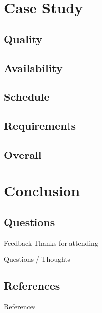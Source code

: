 \section{Case Study}
    \subsection{Quality}
    \subsection{Availability}
    \subsection{Schedule}
    \subsection{Requirements}
    \subsection{Overall}

\section{Conclusion}

    \subsection{Questions}
        \begin{frame}{Feedback}
            \center 
            Thanks for attending
            
            Questions / Thoughts
          
        \end{frame}

    \subsection{References}
        \begin{frame}{References}
            
            
          
        \end{frame}















